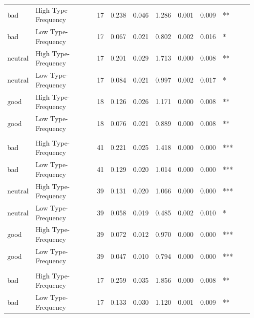 \documentclass[
]{article}
\begin{document}
\begin{longtable}[t]{llrrrrrrlrr}
\hspace{1em}bad & High Type-Frequency & 17 & 0.238 & 0.046 & 1.286 & 0.001 & 0.009 & ** &  & \\
\hspace{1em}bad & Low Type-Frequency & 17 & 0.067 & 0.021 & 0.802 & 0.002 & 0.016 & * &  & \\
\hspace{1em}neutral & High Type-Frequency & 17 & 0.201 & 0.029 & 1.713 & 0.000 & 0.008 & ** &  & \\
\hspace{1em}neutral & Low Type-Frequency & 17 & 0.084 & 0.021 & 0.997 & 0.002 & 0.017 & * &  & \\
\hspace{1em}good & High Type-Frequency & 18 & 0.126 & 0.026 & 1.171 & 0.000 & 0.008 & ** &  & \\
\hspace{1em}good & Low Type-Frequency & 18 & 0.076 & 0.021 & 0.889 & 0.000 & 0.008 & ** &  & \\
\addlinespace[0.3em]
\multicolumn{11}{l}{\textbf{Third Party Acceptability - testable}}\\
\hspace{1em}bad & High Type-Frequency & 41 & 0.221 & 0.025 & 1.418 & 0.000 & 0.000 & *** &  & \\
\hspace{1em}bad & Low Type-Frequency & 41 & 0.129 & 0.020 & 1.014 & 0.000 & 0.000 & *** &  & \\
\hspace{1em}neutral & High Type-Frequency & 39 & 0.131 & 0.020 & 1.066 & 0.000 & 0.000 & *** &  & \\
\hspace{1em}neutral & Low Type-Frequency & 39 & 0.058 & 0.019 & 0.485 & 0.002 & 0.010 & * &  & \\
\hspace{1em}good & High Type-Frequency & 39 & 0.072 & 0.012 & 0.970 & 0.000 & 0.000 & *** &  & \\
\hspace{1em}good & Low Type-Frequency & 39 & 0.047 & 0.010 & 0.794 & 0.000 & 0.000 & *** &  & \\
\addlinespace[0.3em]
\multicolumn{11}{l}{\textbf{Prevalence - students}}\\
\hspace{1em}bad & High Type-Frequency & 17 & 0.259 & 0.035 & 1.856 & 0.000 & 0.008 & ** &  & \\
\hspace{1em}bad & Low Type-Frequency & 17 & 0.133 & 0.030 & 1.120 & 0.001 & 0.009 & ** &  & \\

\end{longtable}
\end{document}
